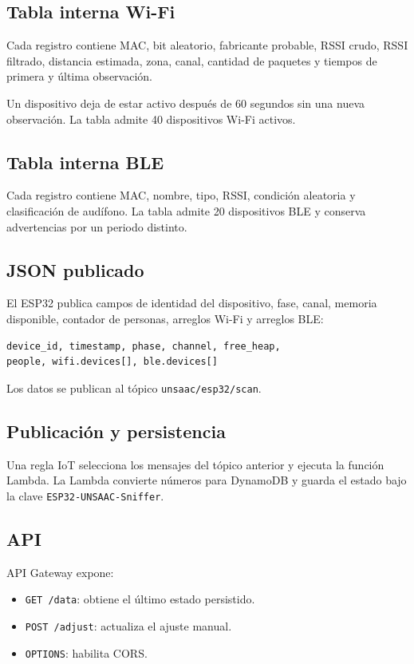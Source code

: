 \documentclass[12pt,a4paper]{article}
\begin{document}
\subsection{Tabla interna Wi-Fi}
Cada registro contiene MAC, bit aleatorio, fabricante probable, RSSI crudo, RSSI filtrado, distancia estimada, zona, canal, cantidad de paquetes y tiempos de primera y última observación.

Un dispositivo deja de estar activo después de 60 segundos sin una nueva observación. La tabla admite 40 dispositivos Wi-Fi activos.

\subsection{Tabla interna BLE}
Cada registro contiene MAC, nombre, tipo, RSSI, condición aleatoria y clasificación de audífono. La tabla admite 20 dispositivos BLE y conserva advertencias por un periodo distinto.

\subsection{JSON publicado}
El ESP32 publica campos de identidad del dispositivo, fase, canal, memoria disponible, contador de personas, arreglos Wi-Fi y arreglos BLE:
\begin{verbatim}
device_id, timestamp, phase, channel, free_heap,
people, wifi.devices[], ble.devices[]
\end{verbatim}
Los datos se publican al tópico \texttt{unsaac/esp32/scan}.

\subsection{Publicación y persistencia}
Una regla IoT selecciona los mensajes del tópico anterior y ejecuta la función Lambda. La Lambda convierte números para DynamoDB y guarda el estado bajo la clave \texttt{ESP32-UNSAAC-Sniffer}.

\subsection{API}
API Gateway expone:
\begin{itemize}
\item \texttt{GET /data}: obtiene el último estado persistido.
\item \texttt{POST /adjust}: actualiza el ajuste manual.
\item \texttt{OPTIONS}: habilita CORS.
\end{itemize}
\end{document}
